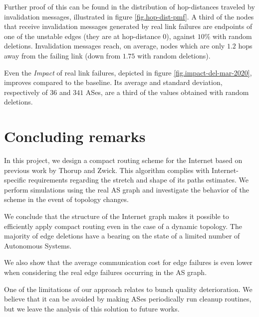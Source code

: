 \documentclass[a4paper,11pt,oneside]{report}
\newcommand{\svg}[1]{{#1}}
\begin{document}
Further proof of this can be found in the distribution of hop-distances traveled by invalidation messages, illustrated in figure \ref{fig.hop-dist-pmf}. A third of the nodes that receive invalidation messages generated by real link failures are endpoints of one of the unstable edges (they are at hop-distance $0$), against $10\%$ with random deletions. Invalidation messages reach, on average, nodes which are only $1.2$ hops away from the failing link (down from $1.75$ with random deletions).

Even the \textit{Impact} of real link failures, depicted in figure \ref{fig.impact-del-mar-2020}, improves compared to the baseline. Its average and standard deviation, respectively of $36$ and $341$ ASes, are a third of the values obtained with random deletions.

\bigskip



\chapter*{Concluding remarks}
In this project, we design a compact routing scheme for the Internet based on previous work by Thorup and Zwick. This algorithm complies with Internet-specific requirements regarding the stretch and shape of its paths estimates.
We perform simulations using the real AS graph and investigate the behavior of the scheme in the event of topology changes. 

\bigskip
We conclude that the structure of the Internet graph makes it possible to efficiently apply compact routing even in the case of a dynamic topology. The majority of edge deletions have a bearing on the state of a limited number of Autonomous Systems.

\noindent
We also show that the average communication cost for edge failures is even lower when considering the real edge failures occurring in the AS graph. 

\bigskip
One of the limitations of our approach relates to bunch quality deterioration. We believe that it can be avoided by making ASes periodically run cleanup routines, but we leave the analysis of this solution to future works.




\cleardoublepage
{}
{}
\nocite{*}
\printbibliography
\end{document}
